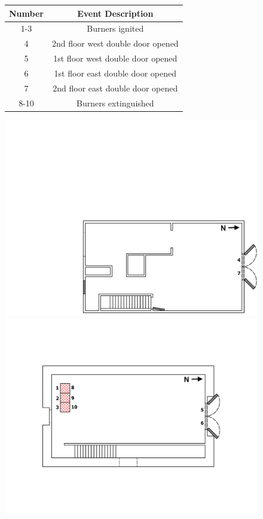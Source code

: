 \documentclass[12pt,oneside]{book}
\begin{document}
\begin{figure}[!ht]
\begin{minipage}[b]{0.8\columnwidth}
	\begin{flushleft}
	\small
	\begin{tabular}[b]{cc}
 	\toprule
 	\textbf{Number} & \textbf{Event Description} \\
 	\midrule
 	1-3  & Burners ignited \\
 	4	 & 2nd floor west double door opened \\
 	5 	 & 1st floor west double door opened \\
 	6	 & 1st floor east double door opened \\
 	7 	 & 2nd floor east double door opened \\
 	8-10  & Burners extinguished \\
	\bottomrule
	\end{tabular}
	\end{flushleft}
\end{minipage}
\begin{minipage}[b]{0.9\columnwidth}
	\vspace{15pt}
	\centering
	\includegraphics[width=\columnwidth]{../Figures/Floor_Plans/West_Structure_2nd_Floor_Test_22}
	\includegraphics[width=\columnwidth]{../Figures/Floor_Plans/West_Structure_1st_Floor_Test_22}

\end{minipage}
\end{figure}
\end{document}
